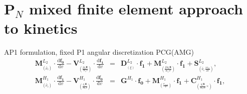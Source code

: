 \documentclass[8pt, compress]{beamer}
\newcommand{\pdv}[2]{\frac{\partial{#1}}{\partial{#2}}}
\newcommand{\vect}[1]{\boldsymbol{#1}}
\newcommand{\matr}[1]{\mathbf{#1}}
\newcommand{\dI}{\text{d}}
\newcommand{\odv}[2]{\frac{\dI #1}{\dI #2}}
\newcommand{\ddv}[2]{\odv{#1}{#2}}
\newcommand{\nue}{\nu_{e}}
\newcommand{\nuscat}{\nu_{scat}}
\newcommand{\vmag}{v}
\newcommand{\E}{\vect{E}}
\newcommand{\B}{\vect{B}}
\newcommand{\qe}{q_e}
\newcommand{\me}{m_e}
\newcommand{\fM}{f_M}
\newcommand{\vfzero}{\vect{f_0}}
\newcommand{\fone}{{\vect{f_1}}}
\newcommand{\colorimportant}[1]{ {\color{purple} #1} }
\begin{document}
\section{P$_N$ mixed finite element approach to kinetics}
\newcommand{\edf}{\colorimportant{f}}
\renewcommand{\fs}{0.4}
\begin{frame}
\begin{center}
{\Large AP1 formulation, fixed P1 angular discretization PCG(AMG)}
\begin{eqnarray}
  \matr{M}^{L_2}_{_{(\tilde{\nue})}}\cdot\ddv{\vfzero}{\vmag} 
  - \matr{V}^{L_2}_{_{(\frac{\xi\qe\E}{\me\vmag})}}\cdot\ddv{\fone}{\vmag}
  &=&
  \matr{D}^{L_2}_{_{(\xi)}}\cdot\fone 
  + \matr{M}^{L_2}_{_{(\frac{\xi2\qe\E}{\me\vmag^2})}}\cdot\fone
  + \vect{S}^{L_2}_{_{(\tilde{\nue}\pdv{\fM}{\vmag})}}, 
  \nonumber\label{eq:FEMAP1f0}
  \\
  \matr{M}^{H_1}_{_{(\tilde{\nue})}}\cdot\ddv{\fone}{\vmag}
  - \matr{V}^{H_1}_{_{(\frac{\qe\E}{\me\vmag})}}\cdot\ddv{\vfzero}{\vmag}
   &=& 
  \matr{G}^{H_1}\cdot\vfzero 
  + \matr{M}^{H_1}_{_{(\frac{\nuscat}{\vmag})}}\cdot\fone 
  + \matr{C}^{H_1}_{_{(\frac{\qe\B}{\me c \vmag}\vect{\times})}}\cdot\fone
  ,
  \nonumber \label{eq:FEMAP1f1}
\end{eqnarray}


\end{center}
\end{frame}
\end{document}
